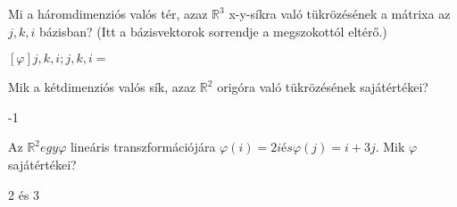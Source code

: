 \begin{frame}
  \begin{tcolorbox}[title={9/2. -R-}]
    Mi a háromdimenziós valós tér, azaz $\mathbb{R}^3$ x-y-síkra való tükrözésének a mátrixa az $j,k,i$ bázisban? (Itt a bázisvektorok sorrendje a megszokottól eltérő.)

  \tcblower

    \mmedskip 
    
     $[{\varphi}]j,k,i;j,k,i =$
  \end{tcolorbox}
\end{frame}


\begin{frame}
  \begin{tcolorbox}[title={9/3. -N-}]
    Mik a kétdimenziós valós sík, azaz $\mathbb{R}^2$ origóra való tükrözésének sajátértékei?

  \tcblower

    \mmedskip 
    
    -1
  \end{tcolorbox}
\end{frame}


\begin{frame}
  \begin{tcolorbox}[title={9/4. -R-}]
    Az $\mathbb{R}^2 egy {\varphi}$ lineáris transzformációjára ${\varphi}(i) = 2i és {\varphi}(j) = i + 3j$. Mik ${\varphi}$ sajátértékei? 
    
  \tcblower

    \mmedskip 
    
     2 és 3
  \end{tcolorbox}
\end{frame}



